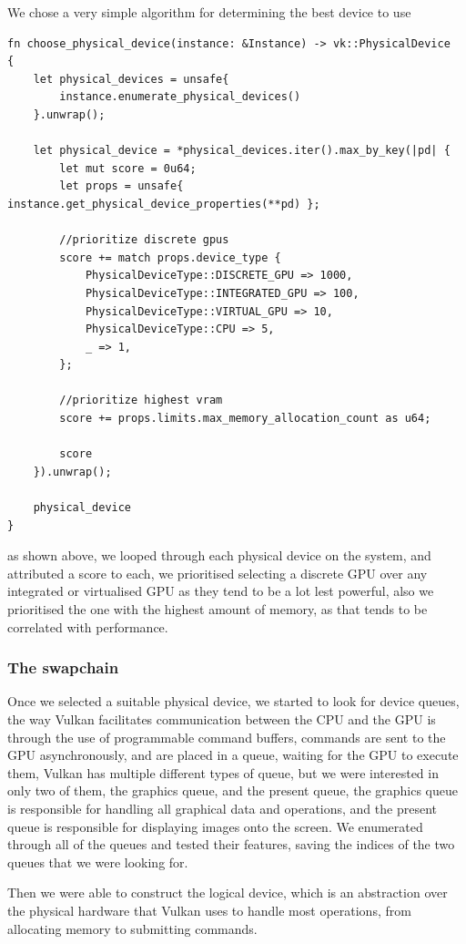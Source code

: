 \documentclass[../report.tex]{subfiles}
\begin{document}
We chose a very simple algorithm for determining the best device to use
\begin{verbatim}
fn choose_physical_device(instance: &Instance) -> vk::PhysicalDevice
{
    let physical_devices = unsafe{ 
        instance.enumerate_physical_devices()
    }.unwrap();

    let physical_device = *physical_devices.iter().max_by_key(|pd| {
        let mut score = 0u64;
        let props = unsafe{ instance.get_physical_device_properties(**pd) };

        //prioritize discrete gpus
        score += match props.device_type {
            PhysicalDeviceType::DISCRETE_GPU => 1000,
            PhysicalDeviceType::INTEGRATED_GPU => 100,
            PhysicalDeviceType::VIRTUAL_GPU => 10,
            PhysicalDeviceType::CPU => 5,
            _ => 1,
        };

        //prioritize highest vram
        score += props.limits.max_memory_allocation_count as u64;

        score
    }).unwrap();

    physical_device
}
\end{verbatim}
as shown above, we looped through each physical device on the system, and attributed a score to each, we prioritised selecting a discrete GPU over any integrated or virtualised GPU as they tend to be a lot lest powerful, also we prioritised the one with the highest amount of memory, as that tends to be correlated with performance.

\subsubsection{The swapchain}
Once we selected a suitable physical device, we started to look for device queues, the way Vulkan facilitates communication between the CPU and the GPU is through the use of programmable command buffers, commands are sent to the GPU asynchronously, and are placed in a queue, waiting for the GPU to execute them, Vulkan has multiple different types of queue, but we were interested in only two of them, the graphics queue, and the present queue, the graphics queue is responsible for handling all graphical data and operations, and the present queue is responsible for displaying images onto the screen. We enumerated through all of the queues and tested their features, saving the indices of the two queues that we were looking for.

Then we were able to construct the logical device, which is an abstraction over the physical hardware that Vulkan uses to handle most operations, from allocating memory to submitting commands.
\end{document}
